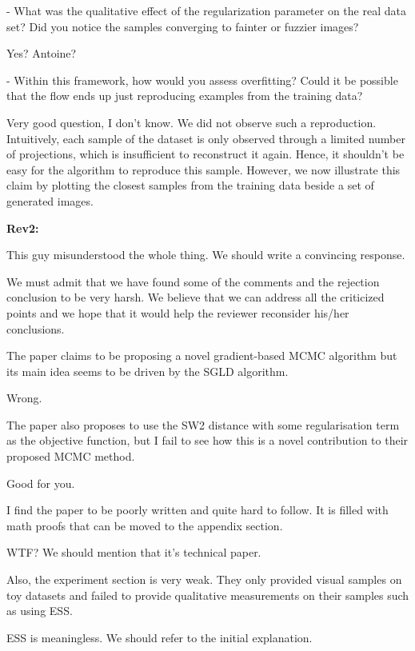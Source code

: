 \documentclass{article}
\newcommand{\rev}[1]{{\color{red} #1}}
\newcommand{\umut}[1]{{\color{blue} #1}}
\newcommand{\antoine}[1]{{\color{orange} #1}}
\begin{document}
\rev{- What was the qualitative effect of the regularization parameter on the real data set? Did you notice the samples converging to fainter or fuzzier images?}

\umut{Yes? Antoine?}

\rev{- Within this framework, how would you assess overfitting? Could it be possible that the flow ends up just reproducing examples from the training data?}

\umut{Very good question, I don't know.}
\antoine{We did not observe such a reproduction. Intuitively, each sample of the dataset is only observed through a limited number of projections, which is insufficient to reconstruct it again. Hence, it shouldn't be easy for the algorithm to reproduce this sample. However, we now illustrate this claim by plotting the closest samples from the training data beside a set of generated images.}

\textbf{Rev2:}

\umut{This guy misunderstood the whole thing. We should write a convincing response.}

\umut{We must admit that we have found some of the comments and the rejection conclusion to be very harsh. We believe that we can address all the criticized points and we hope that it would help the reviewer reconsider his/her conclusions.
}

\rev{The paper claims to be proposing a novel gradient-based MCMC algorithm but its main idea seems to be driven by the SGLD algorithm.}

\umut{Wrong.}

\rev{The paper also proposes to use the SW2 distance with some regularisation term as the objective function, but I fail to see how this is a novel contribution to their proposed MCMC method.}

\umut{Good for you.}

\rev{I find the paper to be poorly written and quite hard to follow. It is filled with math proofs that can be moved to the appendix section.}

\umut{WTF? We should mention that it's technical paper.}

\rev{Also, the experiment section is very weak. They only provided visual samples on toy datasets and failed to provide qualitative measurements on their samples such as using ESS.}

\umut{ESS is meaningless. We should refer to the initial explanation.}
\end{document}
